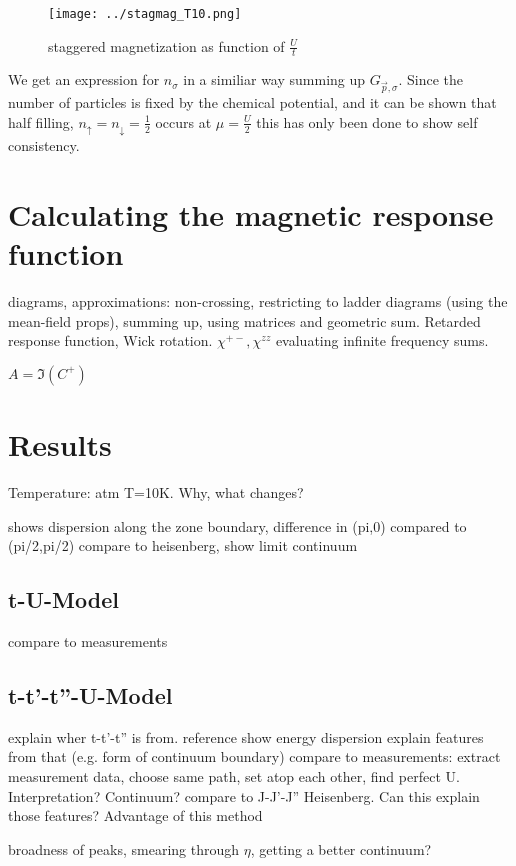 \documentclass[a4paper,10pt]{report}
\begin{document}
\begin{figure}
 \label{ms_nn}
 \texttt{[image: ../stagmag\_T10.png]}
 \caption{staggered magnetization as function of $\frac Ut$}
 
\end{figure}



We get an expression for $n_{\sigma}$ in a similiar way summing up $G_{\vec p,\sigma}$. 
Since the number of particles is fixed by the chemical potential, and it can be shown that half filling, $n_{\uparrow}=n_{\downarrow}=\frac12$ occurs at $\mu=\frac U2$ 
this has only been done to show self consistency.

\section{Calculating the magnetic response function}

diagrams, approximations: non-crossing, restricting to ladder diagrams (using the mean-field props), summing up, using matrices and geometric sum.
Retarded response function, Wick rotation. 
$\chi^{+-},\chi^{zz}$
evaluating infinite frequency sums. 

$A=\Im(C^+)$


\section{Results}
Temperature: atm T=10K. Why, what changes?



shows dispersion along the zone boundary,
difference in (pi,0) compared to (pi/2,pi/2)
compare to heisenberg, show limit
continuum


\subsection{t-U-Model}
compare to measurements
\subsection{t-t'-t''-U-Model}
explain wher t-t'-t'' is from. reference
show energy dispersion
explain features from that (e.g. form of continuum boundary)
compare to measurements: extract measurement data, choose same path, set atop each other, find perfect U. Interpretation? Continuum?
compare to J-J'-J'' Heisenberg. Can this explain those features? Advantage of this method

broadness of peaks, smearing through $\eta$, getting a better continuum?
\newpage
\end{document}
